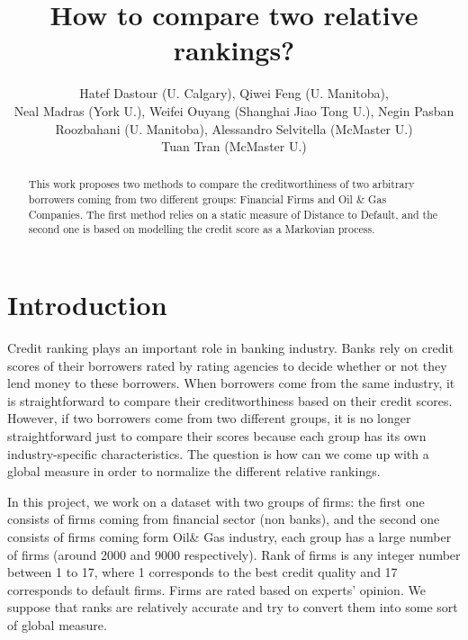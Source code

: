 \documentclass[runningheads,a4paper]{llncs}
\begin{document}
\mainmatter 

\title{How to compare two relative rankings?}

\titlerunning{}

\author{
Hatef Dastour (U. Calgary), Qiwei Feng (U. Manitoba), \\
Neal Madras (York U.), 
Weifei Ouyang (Shanghai Jiao Tong U.),
Negin Pasban Roozbahani (U. Manitoba), 
Alessandro Selvitella (McMaster U.)\\ 
Tuan Tran (McMaster U.)
}

\institute{}

\authorrunning{}

\tocauthor{{}}

\maketitle

\begin{abstract}
This work proposes two methods to compare the creditworthiness of two arbitrary borrowers coming from two different groups: Financial Firms and  Oil \& Gas Companies. The first method relies on a static measure of Distance to Default, and the second one is based on modelling the credit score as a Markovian process.
\end{abstract}

\medskip

\begingroup
\let\clearpage\relax
\tableofcontents
{}
\endgroup

\medskip
\medskip

\section*{Introduction}
Credit ranking plays an important role in banking industry. Banks rely on credit scores of their borrowers rated by rating agencies to decide whether or not they lend money to these  borrowers. When borrowers come from the same industry, it is straightforward to compare their creditworthiness based on their credit scores. However, if two borrowers come from two  different groups, it is no longer straightforward just to compare their scores because each group has its own industry-specific characteristics. The question is how can we come up with a global measure in order to normalize the different relative rankings.

In this project, we work on a dataset with two groups of firms: the first one consists of firms coming from financial sector (non banks), and the second one consists of firms  coming form Oil\& Gas industry, each group has a large number of firms (around 2000 and 9000 respectively). Rank of firms is any integer number between 1 to 17, where 1 corresponds to the best credit quality and 17 corresponds to default firms. Firms are rated based on experts' opinion. We suppose that ranks are relatively accurate and try to convert them into some sort of global measure. 
\end{document}
